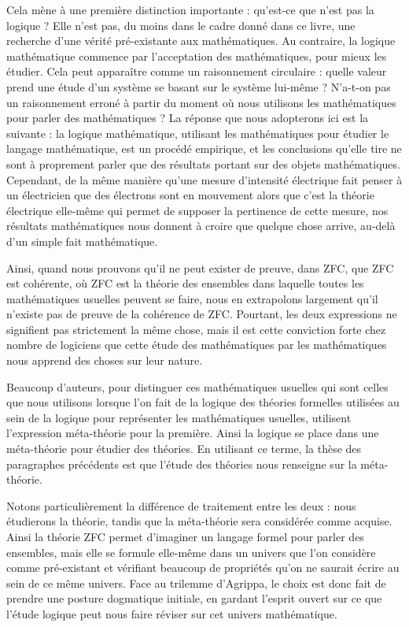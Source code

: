 Cela mène à une première distinction importante : qu'est-ce que n'est pas la
logique ? Elle n'est pas, du moins dans le cadre donné dans ce livre, une
recherche d'une vérité pré-existante aux mathématiques. Au contraire, la logique
mathématique commence par l'acceptation des mathématiques, pour mieux les
étudier. Cela peut apparaître comme un raisonnement circulaire : quelle valeur
prend une étude d'un système se basant sur le système lui-même ? N'a-t-on pas un
raisonnement erroné à partir du moment où nous utilisons les mathématiques pour
parler des mathématiques ? La réponse que nous adopterons ici est la suivante :
la logique mathématique, utilisant les mathématiques pour étudier le langage
mathématique, est un procédé empirique, et les conclusions qu'elle tire ne sont
à proprement parler que des résultats portant sur des objets mathématiques.
Cependant, de la même manière qu'une mesure d'intensité électrique fait penser à
un électricien que des électrons sont en mouvement alors que c'est la théorie
électrique elle-même qui permet de supposer la pertinence de cette mesure, nos
résultats mathématiques nous donnent à croire que quelque chose arrive, au-delà
d'un simple fait mathématique.

Ainsi, quand nous prouvons qu'il ne peut exister de preuve, dans ZFC, que ZFC
est cohérente, où ZFC est la théorie des ensembles dans laquelle toutes les
mathématiques usuelles peuvent se faire, nous en extrapolons largement qu'il
n'existe pas de preuve de la cohérence de ZFC. Pourtant, les deux expressions
ne signifient pas strictement la même chose, mais il est cette conviction forte
chez nombre de logiciens que cette étude des mathématiques par les mathématiques
nous apprend des choses sur leur nature.

Beaucoup d'auteurs, pour distinguer ces mathématiques usuelles qui sont celles
que nous utilisons lorsque l'on fait de la logique des théories formelles
utilisées au sein de la logique pour représenter les mathématiques usuelles,
utilisent l'expression \og méta-théorie\fg{} pour la première. Ainsi la logique
se place dans une méta-théorie pour étudier des théories. En utilisant ce terme,
la thèse des paragraphes précédents est que l'étude des théories nous renseigne
sur la méta-théorie.

Notons particulièrement la différence de traitement entre les deux : nous
étudierons la théorie, tandis que la méta-théorie sera considérée comme acquise.
Ainsi la théorie ZFC permet d'imaginer un langage formel pour parler des
ensembles, mais elle se formule elle-même dans un univers que l'on considère
comme pré-existant et vérifiant beaucoup de propriétés qu'on ne saurait écrire
au sein de ce même univers. Face au trilemme d'Agrippa, le choix est donc fait
de prendre une posture dogmatique initiale, en gardant l'esprit ouvert sur ce
que l'étude logique peut nous faire réviser sur cet univers mathématique.

